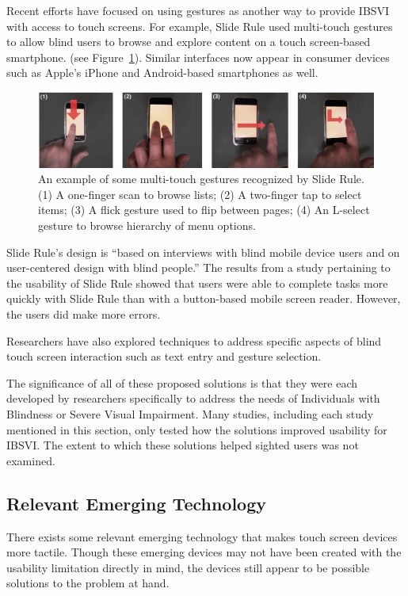 \documentclass[11pt]{article}
\begin{document}
Recent efforts have focused on using gestures as another way to provide IBSVI with access to touch screens. For example, Slide Rule \cite{Kane:2008:SRM:1414471.1414487} used multi-touch gestures to allow blind users to browse and explore content on a touch screen-based smartphone. (see Figure~\ref{slide-rule}). Similar interfaces now appear in consumer devices such as Apple's iPhone\cite{AppleMultiTouch} and Android-based smartphones \cite{AndroidMultiTouch} as well.


\begin{figure}[ht]
\centering
\includegraphics[width=4.5in]{slide-rule.jpg} 
\caption{An example of some multi-touch gestures recognized by Slide Rule.(1) A one-finger scan to browse lists; (2) A two-finger tap to select items; (3) A flick gesture used to flip between pages; (4) An L-select gesture to browse hierarchy of menu options. \cite{Kane:2008:SRM:1414471.1414487} }
\label{slide-rule}
\end{figure}

Slide Rule's design is ``based on interviews with blind mobile device users and on user-centered design with blind people.'' \cite{Kane:2008:SRM:1414471.1414487} The results from a study pertaining to the usability of Slide Rule showed that users were able to complete tasks more quickly with Slide Rule than with a button-based mobile screen reader. However, the users did make more errors. \cite{Kane:2008:SRM:1414471.1414487} 

Researchers have also explored techniques to address specific aspects of blind touch screen interaction such as text entry\cite{Tinwala:2010:ETE:1868914.1868972, Bonner:2010:NNA:2166616.2166649} and gesture selection.\cite{Kane:2011:UGB:1978942.1979001}

The significance of all of these proposed solutions is that they were each developed by researchers specifically to address the needs of Individuals with Blindness or Severe Visual Impairment. Many studies, including each study mentioned in this section, only tested how the solutions improved usability for IBSVI. The extent to which these solutions helped sighted users was not examined.
  

\subsection{Relevant Emerging Technology}
There exists some relevant emerging technology that makes touch screen devices more tactile. Though these emerging devices may not have been created with the usability limitation directly in mind, the devices still appear to be possible solutions to the problem at hand.
\end{document}
